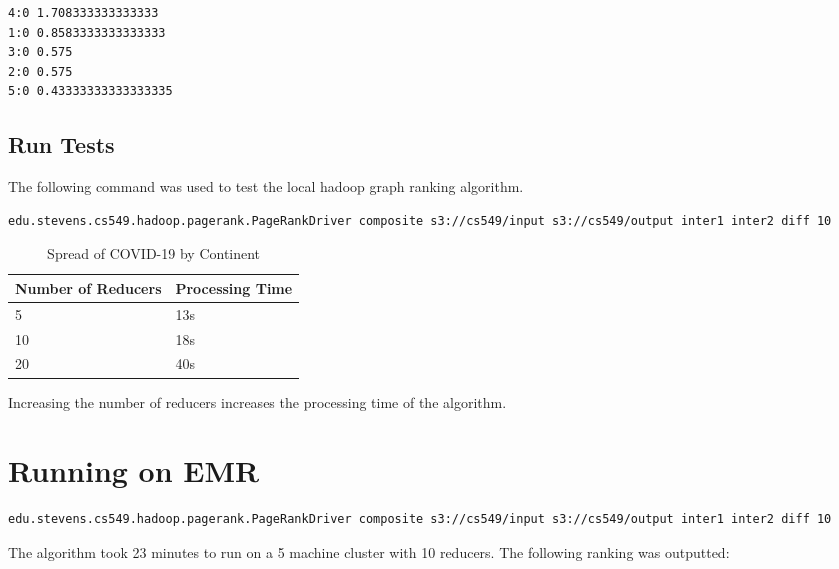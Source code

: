 \documentclass{homework}
\begin{document}
\begin{lstlisting}[caption={output.txt}]
4:0	1.708333333333333
1:0	0.8583333333333333
3:0	0.575
2:0	0.575
5:0	0.43333333333333335
\end{lstlisting}

\subsection{Run Tests}

The following command was used to test the local hadoop graph ranking algorithm. 

\begin{lstlisting}[language=Bash, caption={Local Command}]
edu.stevens.cs549.hadoop.pagerank.PageRankDriver composite s3://cs549/input s3://cs549/output inter1 inter2 diff 10
\end{lstlisting}

\begin{table}[h]
    \caption{Spread of COVID-19 by Continent}
    \centering
    \begin{tabular}{|ll|}
    \hline
    Number of Reducers & Processing Time \\ \hline
    5                  & 13s             \\
    10                 & 18s             \\
    20                 & 40s             \\ \hline
    \end{tabular}
\end{table}

Increasing the number of reducers increases the processing time of the algorithm.


\newpage
\section{Running on EMR}

\begin{lstlisting}[language=Bash, caption={Custom JAR Command}]
edu.stevens.cs549.hadoop.pagerank.PageRankDriver composite s3://cs549/input s3://cs549/output inter1 inter2 diff 10
\end{lstlisting}

The algorithm took 23 minutes to run on a 5 machine cluster with 10 reducers. The following ranking was outputted: 
\end{document}
